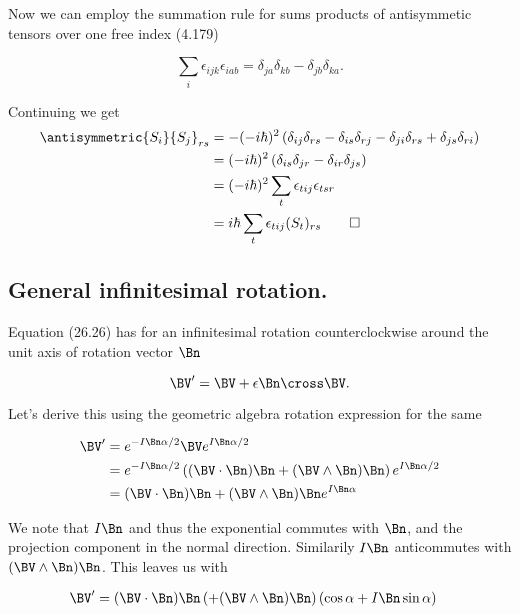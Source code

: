 Now we can employ the summation rule for sums products of antisymmetic tensors over one free index (4.179) 

\begin{equation}\label{eqn:desaiCh26:50}
\sum_i 
\epsilon_{ijk} \epsilon_{iab}
= 
\delta_{ja}
\delta_{kb}
-\delta_{jb}
\delta_{ka}.
\end{equation}

Continuing we get
\begin{align*}
{\antisymmetric{S_i}{S_j}}_{rs} 
&=
-(-i\hbar)^2 \left(
\delta_{ij}
\delta_{rs}
-\delta_{is}
\delta_{rj}
-\delta_{ji}
\delta_{rs}
+\delta_{js}
\delta_{ri} \right) \\
&=
(-i\hbar)^2 \left( 
\delta_{is}
\delta_{jr}
-
\delta_{ir} 
\delta_{js}
\right)
\\
&=
(-i\hbar)^2 \sum_t \epsilon_{tij} \epsilon_{tsr}
\\
&=
i\hbar \sum_t \epsilon_{tij} (S_t)_{rs}
\qquad\square
\end{align*}

\subsection{General infinitesimal rotation.}

Equation (26.26) has for an infinitesimal rotation counterclockwise around the unit axis of rotation vector $\Bn$

\begin{equation}\label{eqn:desaiCh26:60}
\BV' = \BV + \epsilon \Bn \cross \BV.
\end{equation}

Let's derive this using the geometric algebra rotation expression for the same

\begin{align*}
\BV' 
&=
e^{-I\Bn \alpha/2}
\BV 
e^{I\Bn \alpha/2} \\
&=
e^{-I\Bn \alpha/2}
\left(
(\BV \cdot \Bn)\Bn
+(\BV \wedge \Bn)\Bn
\right)
e^{I\Bn \alpha/2} \\
&=
(\BV \cdot \Bn)\Bn
+(\BV \wedge \Bn)\Bn
e^{I\Bn \alpha}
\end{align*}

We note that $I\Bn$ and thus the exponential commutes with $\Bn$, and the projection component in the normal direction.  Similarily $I\Bn$ anticommutes with $(\BV \wedge \Bn) \Bn$.  This leaves us with

\begin{align*}
\BV' 
&=
(\BV \cdot \Bn)\Bn
\left(
+(\BV \wedge \Bn)\Bn
\right)
( \cos \alpha + I \Bn \sin\alpha)
\end{align*}

